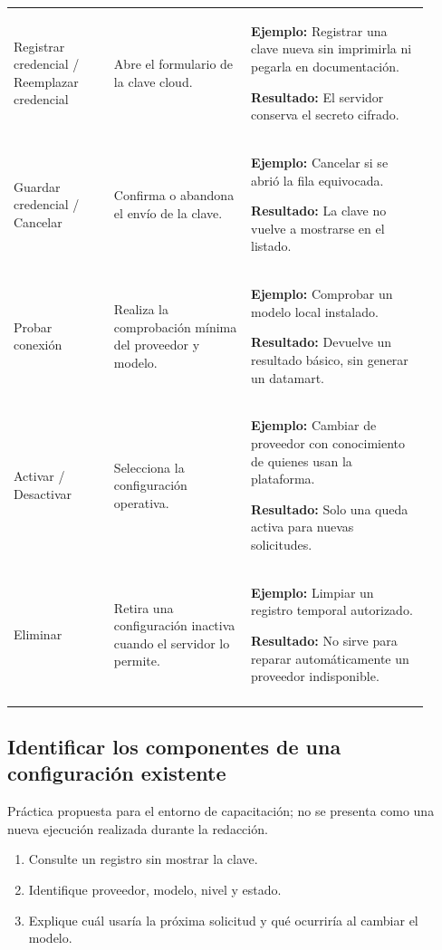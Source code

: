 \begin{longtable}{@{}>{\RaggedRight\arraybackslash}p{0.22\linewidth}>{\RaggedRight\arraybackslash}p{0.3\linewidth}>{\RaggedRight\arraybackslash}p{0.39\linewidth}@{}}
Registrar credencial / Reemplazar credencial & Abre el formulario de la clave cloud. & \textbf{Ejemplo:} Registrar una clave nueva sin imprimirla ni pegarla en documentación.\par\smallskip\textbf{Resultado:} El servidor conserva el secreto cifrado. \\
\addlinespace[3pt]
Guardar credencial / Cancelar & Confirma o abandona el envío de la clave. & \textbf{Ejemplo:} Cancelar si se abrió la fila equivocada.\par\smallskip\textbf{Resultado:} La clave no vuelve a mostrarse en el listado. \\
\addlinespace[3pt]
Probar conexión & Realiza la comprobación mínima del proveedor y modelo. & \textbf{Ejemplo:} Comprobar un modelo local instalado.\par\smallskip\textbf{Resultado:} Devuelve un resultado básico, sin generar un datamart. \\
\addlinespace[3pt]
Activar / Desactivar & Selecciona la configuración operativa. & \textbf{Ejemplo:} Cambiar de proveedor con conocimiento de quienes usan la plataforma.\par\smallskip\textbf{Resultado:} Solo una queda activa para nuevas solicitudes. \\
\addlinespace[3pt]
Eliminar & Retira una configuración inactiva cuando el servidor lo permite. & \textbf{Ejemplo:} Limpiar un registro temporal autorizado.\par\smallskip\textbf{Resultado:} No sirve para reparar automáticamente un proveedor indisponible. \\
\addlinespace[3pt]
\end{longtable}
\endgroup

\subsection{Identificar los componentes de una configuración existente}
Práctica propuesta para el entorno de capacitación; no se presenta como una nueva ejecución realizada durante la redacción.

\begin{enumerate}
\item Consulte un registro sin mostrar la clave.
\item Identifique proveedor, modelo, nivel y estado.
\item Explique cuál usaría la próxima solicitud y qué ocurriría al cambiar el modelo.
\end{enumerate}

